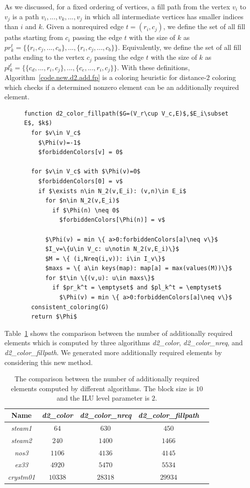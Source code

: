 \documentclass[12pt, twoside,a4paper,toc=bibliography]{scrbook}
\newcommand{\coderef}[1]{Algorithm~\protect\ref{#1}}
\begin{document}
As we discussed, for a fixed ordering of vertices,
a fill path from the vertex $v_i$ to $v_j$ is a path $v_i,...,v_k,...,v_j$
in which all intermediate vertices has smaller indices than $i$ and $k$.
Given a nonrequired edge $t=(r_i,c_j)$, we define the set of all fill paths starting
from $c_i$ passing the edge $t$ with the size of $k$ as
$pr_k^t = \{\{ r_i,c_j,...,c_a\},...,\{ r_i,c_j,...,c_b\}\}$.
Equivalently, we define the set of all fill paths ending to the vertex $c_j$
passing the edge $t$ with the size of $k$ as
$pl_k^t = \{ \{c_d,...,r_i,c_j\},..., \{c_e,...,r_i,c_j\}\}$.
With these definitions, \coderef{code.new.d2.add.fp} is a coloring heuristic
for distance-$2$ coloring which checks if a determined nonzero element can be an
additionally required element.
\begin{figure}
\begin{lstlisting}[caption=New coloring heuristic for distance-$2$ coloring
predicting if a determined nonrequired elements can be an additionally required element.,
label=code.new.d2.add.fp,mathescape]
function d2_color_fillpath($G=(V_r\cup V_c,E)$,$E_i\subset E$, $k$)
  for $v\in V_c$
    $\Phi(v)=-1$
    $forbiddenColors[v] = 0$

  for $v\in V_c$ with $\Phi(v)=0$
    $forbiddenColors[0] = v$
    if $\exists n\in N_2(v,E_i): (v,n)\in E_i$
      for $n\in N_2(v,E_i)$
        if $\Phi(n) \neq 0$
          $forbiddenColors[\Phi(n)] = v$

      $\Phi(v) = min \{ a>0:forbiddenColors[a]\neq v\}$
      $I_v=\{u\in V_c: u\notin N_2(v,E_i)\}$
      $M = \{ (i,Nreq(i,v)): i\in I_v\}$
      $maxs = \{ a\in keys(map): map[a] = max(values(M))\}$
      for $t\in \{(v,u): u\in maxs\}$
        if $pr_k^t = \emptyset$ and $pl_k^t = \emptyset$
          $\Phi(v) = min \{ a>0:forbiddenColors[a]\neq v\}$
  consistent_coloring(G)
  return $\Phi$
\end{lstlisting}
\end{figure}
Table~\ref{mats.add.gr.vs.nreq.vs.fillpath} shows the comparison between the number of additionally required elements
which is computed by three algorithms \textit{d2\_color},
 \textit{d2\_color\_nreq}, and \textit{d2\_color\_fillpath}. We generated more additionally required elements
by considering this new method.
\begin{table}
\centering
\begin{tabular}{|c|c|c|c|c|}
\hline
Name & \textit{d2\_color}& \textit{d2\_color\_nreq} & \textit{d2\_color\_fillpath}\\\hline
\textit{steam1} & $64$ & $630$ & $450$ \\\hline
\textit{steam2} & $240$ & $1400$ & $1466$ \\\hline
\textit{nos3} & $1106$ & $4136$ & $4145$\\\hline
\textit{ex33} & $4920$ & $5470$ & $5534$\\\hline
\textit{crystm01} & $10338$ & $28318$ & $29934$\\\hline
\end{tabular}
\caption{The comparison between the number of additionally required
elements computed by different algorithms.
The block size is $10$ and the ILU level parameter is $2$.}
\label{mats.add.gr.vs.nreq.vs.fillpath}
\end{table}
\end{document}
